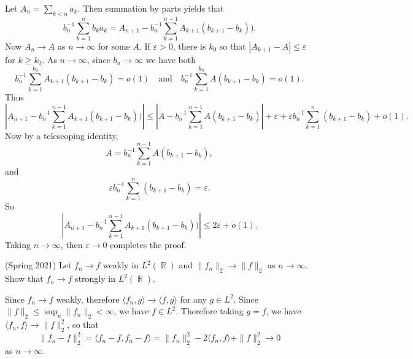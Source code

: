 \documentclass[answers]{exam}
\DeclareMathOperator{\RR}{\mathbb{R}}
\begin{document}
\begin{questions}
\begin{solution}
Let $A_n = \sum_{k < n} a_k$. Then summation by parts yields that
%
\[ b_n^{-1} \sum_{k = 1}^n b_k a_k = A_{n+1} - b_n^{-1} \sum_{k = 1}^{n-1} A_{k+1} ( b_{k+1} - b_k ) ). \]
%
Now $A_n \to A$ as $n \to \infty$ for some $A$. If $\varepsilon > 0$, there is $k_0$ so that $|A_{k+1} - A| \leq \varepsilon$ for $k \geq k_0$. As $n \to \infty$, since $b_n \to \infty$ we have both
%
\[ b_n^{-1} \sum_{k = 1}^{k_0} A_{k+1} (b_{k+1} - b_k) = o(1) \quad\text{and}\quad b_n^{-1} \sum_{k = 1}^{k_0} A (b_{k+1} - b_k) = o(1). \]
%
Thus
%
\[ \left| A_{n+1} - b_n^{-1} \sum_{k = 1}^{n-1} A_{k+1} ( b_{k+1} - b_k ) ) \right| \leq |A - b_n^{-1} \sum_{k = 1}^{n-1} A (b_{k+1} - b_k)| + \varepsilon + \varepsilon b_n^{-1} \sum_{k = 1}^n (b_{k+1} - b_k) + o(1). \]
%
Now by a telescoping identity,
%
\[ A = b_n^{-1} \sum_{k = 1}^{n-1} A (b_{k+1} - b_k), \]
%
and
%
\[ \varepsilon b_n^{-1} \sum_{k = 1}^n (b_{k+1} - b_k) = \varepsilon. \]
%
So
%
\[ \left| A_{n+1} - b_n^{-1} \sum_{k = 1}^{n-1} A_{k+1} ( b_{k+1} - b_k ) ) \right| \leq 2\varepsilon + o(1). \]
%
Taking $n \to \infty$, then $\varepsilon \to 0$ completes the proof.
\end{solution}

\question (Spring 2021) Let $f_n \to f$ weakly in $L^2(\RR)$ and $ \| f_n \|_2 \to  \| f \|_2$ as $n\to\infty$. Show that $f_n\to f$ strongly in $L^2(\RR)$.

\begin{solution}
Since $f_n\to f$ weakly, therefore $\langle f_n, g \rangle \to \langle f, g \rangle$ for any $g\in L^2$. Since $\| f \|_2 \leq \sup_{n} \|f_n \|_2 <\infty$, we have $f\in L^2$. Therefore taking $g=f$, we have $\langle f_n,f\rangle \to \| f \|_2^2$, so that
\begin{equation*}
\| f_n-f \|_2^2 = \langle f_n-f,f_n-f\rangle = \| f_n \|_2^2 -2 \langle f_n,f\rangle + \| f \|^2_2 \to 0
\end{equation*}
as $n\to \infty$.
\end{solution}









\end{questions}
\end{document}
